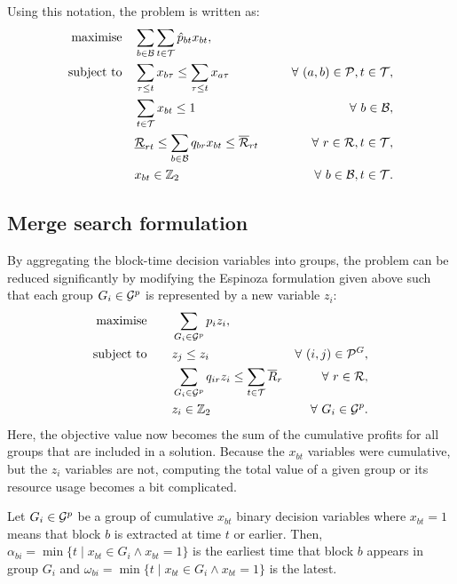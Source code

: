 \documentclass[journal]{IEEEtran}
\begin{document}
Using this notation, the problem is written as:
\begin{align}
\Max \quad & \displaystyle\sum_{b \in \S{B}}\displaystyle\sum_{t \in \S{T}} \hat{p}_{bt}x_{bt},\label{eq:cpit_form}\\
\ST \quad & \displaystyle\sum_{\tau \leq t}x_{b\tau} \leq \displaystyle\sum_{\tau \leq t}x_{a\tau} \qquad \qquad & \forall\ (a,b) \in \mathcal{P}, t \in \S{T},\nonumber\\
& \displaystyle\sum_{t \in \S{T}}x_{bt} \leq 1 & \forall\ b \in \S{B},\nonumber\\
& \underline{\S{R}}_{rt} \leq \displaystyle\sum_{b \in \S{B}}q_{br}x_{bt} \leq \overline{\S{R}}_{rt} & \forall\ r \in \S{R}, t \in \S{T},\nonumber\\
& x_{bt} \in \Bin & \forall\ b \in \S{B}, t \in \S{T}\nonumber.
\end{align}

\subsection*{Merge search formulation}

By aggregating the block-time decision variables into groups, the problem can be reduced significantly by modifying the Espinoza formulation given above such that each group $G_i \in \S{G}^p$ is represented by a new variable $z_i$: 
\begin{align}
\Max \qquad & \displaystyle\sum_{G_i \in \S{G}^p} p_{i}z_i,\label{eq:cpit_merge}\\
\ST \qquad & z_j \leq z_i \qquad \qquad & \forall\ (i,j) \in \mathcal{P}^G, \nonumber\\
& \displaystyle\sum_{G_i \in \S{G}^p}q_{ir}z_i \leq \displaystyle\sum_{t \in \S{T}}\overline{R}_{r} & \forall\ r \in \S{R}, \nonumber\\
& z_i \in \Bin & \forall\ G_i \in \S{G}^p \nonumber.
\end{align}
Here, the objective value now becomes the sum of the cumulative profits for all groups that are included in a solution. Because the $x_{bt}$ variables were cumulative, but the $z_i$ variables are not, computing the total value of a given group or its resource usage becomes a bit complicated.

\begin{definition}
Let $G_i \in \S{G}^p$ be a group of cumulative \(x_{bt}\) binary decision variables where \(x_{bt} = 1\) means that block $b$ is extracted at time $t$ or earlier. Then, \(\alpha_{bi} = \min\{t \mid x_{bt} \in G_i \land x_{bt} = 1\}\) is the earliest time that block \(b\) appears in group \(G_i\) and \(\omega_{bi} = \min\{t \mid x_{bt} \in G_i \land x_{bt} = 1\}\) is the latest.
\end{definition}
\end{document}
